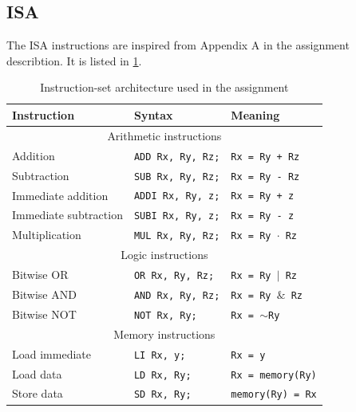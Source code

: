 \documentclass[a4paper, english]{article}
\numberwithin{equation}{section}
\begin{document}
\subsection{ISA}
The ISA instructions are inspired from Appendix A in the assignment describtion. It is listed in \cref{tbl:ISA}.
\begin{table}[H]
    \centering
    \caption{Instruction-set architecture used in the assignment}\label{tbl:ISA}
    \begin{tabular}{lll}
        \toprule
        \textbf{Instruction}  & \textbf{Syntax}          & \textbf{Meaning}                 \\
        \midrule
        \multicolumn{3}{c}{Arithmetic instructions}                                         \\
        \midrule
        Addition              & \texttt{ADD Rx, Ry, Rz;} & \texttt{Rx = Ry + Rz}            \\
        Subtraction           & \texttt{SUB Rx, Ry, Rz;} & \texttt{Rx = Ry - Rz}            \\
        Immediate addition    & \texttt{ADDI Rx, Ry, z;} & \texttt{Rx = Ry + z}             \\
        Immediate subtraction & \texttt{SUBI Rx, Ry, z;} & \texttt{Rx = Ry - z}             \\
        Multiplication        & \texttt{MUL Rx, Ry, Rz;} & \texttt{Rx = Ry \(\cdot\) Rz}    \\
        \midrule
        \multicolumn{3}{c}{Logic instructions}                                              \\
        \midrule
        Bitwise OR            & \texttt{OR Rx, Ry, Rz;}  & \texttt{Rx = Ry \(\vert\) Rz}    \\
        Bitwise AND           & \texttt{AND Rx, Ry, Rz;} & \texttt{Rx = Ry \(\&\) Rz}       \\
        Bitwise NOT           & \texttt{NOT Rx, Ry;}     & \texttt{Rx = \(\sim\)Ry}         \\
        \midrule
        \multicolumn{3}{c}{Memory instructions}                                             \\
        \midrule
        Load immediate        & \texttt{LI Rx, y;}       & \texttt{Rx = y}                  \\
        Load data             & \texttt{LD Rx, Ry;}      & \texttt{Rx = memory(Ry)}         \\
        Store data            & \texttt{SD Rx, Ry;}      & \texttt{memory(Ry) = Rx}         \\

\end{tabular}
\end{table}
\end{document}
